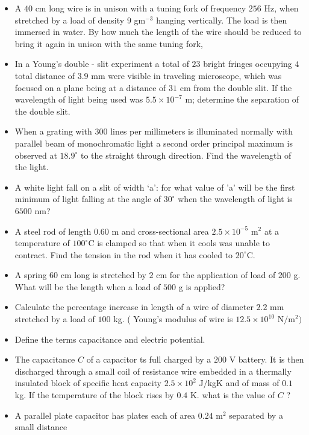 \documentclass{article}
\begin{document}
\begin{itemize}
\item A $ 40$ cm long wire is in unison with a tuning fork of frequency $ 256$ Hz, when stretched by a load of density $ 9$ gm$ ^{-3}$ hanging vertically. The load is then immersed in water. By how much the length of the wire should be reduced to bring it again in unison with the same tuning fork,
\item In a Young's double - slit experiment a total of $ 23$ bright fringes occupying $ 4$ total distance of $ 3.9$ mm were visible in traveling microscope, which was focused on a plane being at a distance of $ 31$ cm from the double slit. If the wavelength of light being used was $ 5.5 \times 10^{-7}$ m; determine the separation of the double slit.
\item When a grating with $ 300$ lines per millimeters is illuminated normally with parallel beam of monochromatic light a second order principal maximum is observed at $ 18.9^{\circ}$ to the straight through direction. Find the wavelength of the light.
\item A white light fall on a slit of width ‘a’: for what value of 'a' will be the first minimum of light falling at the angle of $ 30^{\circ}$ when the wavelength of light is $ 6500$ nm? 
\item A steel rod of length $ 0.60$ m and cross-sectional area $ 2.5 \times 10^{-5}$ m$ ^{2}$ at a temperature of $ 100^{\circ}$C is clamped so that when it cools was unable to contract. Find the tension in the rod when it has cooled to $ 20^{\circ}$C. 
\item A spring $ 60$ cm long is stretched by $ 2$ cm for the application of load of $ 200$ g. What will be the length when a load of $ 500$ g is applied? 
\item Calculate the percentage increase in length of a wire of diameter $ 2.2$ mm stretched by a load of $ 100$ kg. ( Young's modulus of wire is $ 12.5 \times 10^{10}$ N$/$m$ ^{2})$
\item Define the terms capacitance and electric potential. 
\item The capacitance $ C$ of a capacitor ts full charged by a $ 200$ V battery. It is then discharged through a small coil of resistance wire embedded in a thermally insulated block of specific heat capacity $ 2.5 \times 10^{2}$ J$/$kgK and of mass of $ 0.1$ kg.  If the temperature of the block rises by $ 0.4$ K. what is the value of $ C$ ?
\item A parallel plate capacitor has plates each of area $ 0.24$ m$ ^{2}$ separated by a small distance
 \begin{itemize}

\end{itemize}
\end{itemize}
\end{document}
